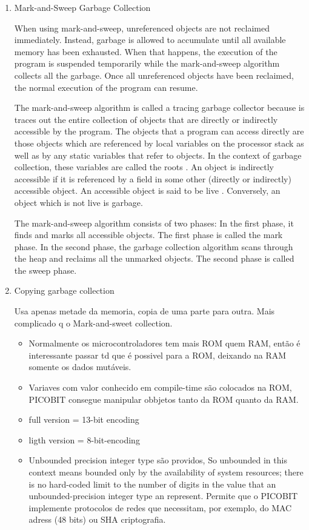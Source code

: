 \documentclass[11pt]{article}
\begin{document}
\begin{enumerate}
\item Mark-and-Sweep Garbage Collection
\label{sec-1-2-3-1}

When using mark-and-sweep, unreferenced objects are not reclaimed immediately. Instead, garbage is allowed to accumulate until all available memory has been exhausted. When that happens, the execution of the program is suspended temporarily while the mark-and-sweep algorithm collects all the garbage. Once all unreferenced objects have been reclaimed, the normal execution of the program can resume.

The mark-and-sweep algorithm is called a tracing garbage collector because is traces out the entire collection of objects that are directly or indirectly accessible by the program. The objects that a program can access directly are those objects which are referenced by local variables on the processor stack as well as by any static variables that refer to objects. In the context of garbage collection, these variables are called the roots . An object is indirectly accessible if it is referenced by a field in some other (directly or indirectly) accessible object. An accessible object is said to be live . Conversely, an object which is not live is garbage.

The mark-and-sweep algorithm consists of two phases: In the first phase, it finds and marks all accessible objects. The first phase is called the mark phase. In the second phase, the garbage collection algorithm scans through the heap and reclaims all the unmarked objects. The second phase is called the sweep phase.

\item Copying garbage collection
\label{sec-1-2-3-2}

Usa apenas metade da memoria, copia de uma parte para outra.
Mais complicado q o Mark-and-sweet collection.

\begin{itemize}
\item Normalmente os microcontroladores tem mais ROM quem RAM, então é interessante passar td que é possivel para a ROM, deixando na RAM somente os dados mutáveis.
\item Variaves com valor conhecido em compile-time são colocados na ROM, PICOBIT consegue manipular obbjetos tanto da ROM quanto da RAM.
\item full version = 13-bit encoding
\item ligth version = 8-bit-encoding
\item Unbounded precision integer type são providos, So unbounded in this context means bounded only by the availability of system resources; there is no hard-coded limit to the number of digits in the value that an unbounded-precision integer type an represent. Permite que o PICOBIT implemente protocolos de redes que necessitam, por exemplo, do MAC adress (48 bits) ou  SHA criptografia.
\end{itemize}
\end{enumerate}
\end{document}
